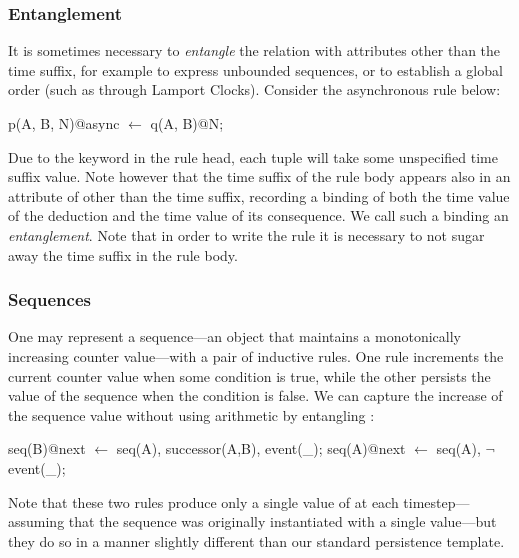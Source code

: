 \subsubsection{Entanglement}
\label{sec:entangle}

It is sometimes necessary to {\em entangle} the  relation
with attributes other than the time suffix, for example to express unbounded
sequences, or to establish a global order (such as through Lamport Clocks).
Consider the asynchronous rule below:

\begin{Dedalus}
p(A, B, N)@async \(\leftarrow\)
  q(A, B)@N;
\end{Dedalus}
\noindent

Due to the  keyword in the rule head, each  tuple
will take some unspecified time suffix value.  Note however that the time
suffix  of the rule body appears also in an attribute of 
other than the time suffix, recording a binding of both the time value of the
deduction and the time value of its consequence.  We call such a binding an
{\em entanglement}.   Note that in order to write the rule it is necessary to
not sugar away the time suffix in the rule body.  

\subsubsection{Sequences}

One may represent a sequence---an object that maintains a monotonically
increasing counter value---with a pair of inductive rules.  One rule
increments the current counter value when some condition is true, while the
other persists the value of the sequence when the condition is false.  We can
capture the increase of the sequence value without using arithmetic by
entangling :

\begin{Dedalus}
seq(B)@next \(\leftarrow\) seq(A), successor(A,B), event(_);  
seq(A)@next \(\leftarrow\) seq(A), \(\lnot\)event(_);
\end{Dedalus}

\noindent Note that these two rules produce only a single value of
 at each timestep---assuming that the sequence was originally
instantiated with a single value---but they do so in a manner slightly
different than our standard persistence template.

